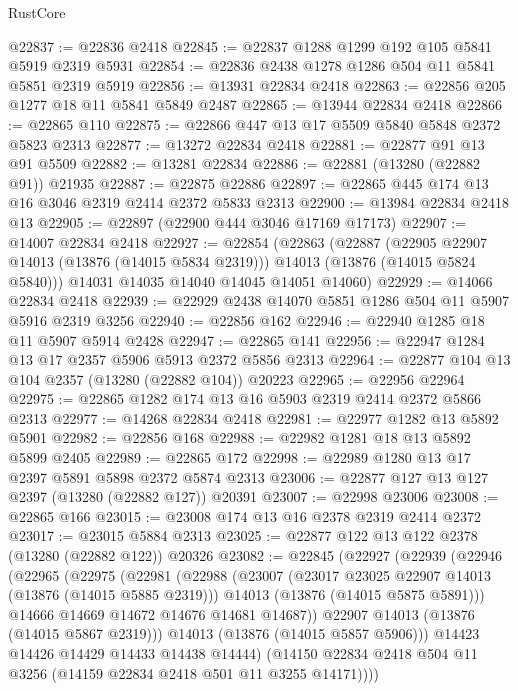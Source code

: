 \begin{lexlean}{RustCore}
\begin{coremodule}
@22837 := @22836 @2418
@22845 := @22837 @1288 @1299 @192 @105 @5841 @5919 @2319 @5931
@22854 := @22836 @2438 @1278 @1286 @504 @11 @5841 @5851 @2319 @5919
@22856 := @13931 @22834 @2418
@22863 := @22856 @205 @1277 @18 @11 @5841 @5849 @2487
@22865 := @13944 @22834 @2418
@22866 := @22865 @110
@22875 := @22866 @447 @13 @17 @5509 @5840 @5848 @2372 @5823 @2313
@22877 := @13272 @22834 @2418
@22881 := @22877 @91 @13 @91 @5509
@22882 := @13281 @22834
@22886 := @22881 (@13280 (@22882 @91)) @21935
@22887 := @22875 @22886
@22897 := @22865 @445 @174 @13 @16 @3046 @2319 @2414 @2372 @5833 @2313
@22900 := @13984 @22834 @2418 @13
@22905 := @22897 (@22900 @444 @3046 @17169 @17173)
@22907 := @14007 @22834 @2418
@22927 := @22854
    (@22863
      (@22887
        (@22905 @22907 @14013 (@13876 (@14015 @5834 @2319)))
        @14013
        (@13876 (@14015 @5824 @5840)))
      @14031
      @14035
      @14040
      @14045
      @14051
      @14060)
@22929 := @14066 @22834 @2418
@22939 := @22929 @2438 @14070 @5851 @1286 @504 @11 @5907 @5916 @2319 @3256
@22940 := @22856 @162
@22946 := @22940 @1285 @18 @11 @5907 @5914 @2428
@22947 := @22865 @141
@22956 := @22947 @1284 @13 @17 @2357 @5906 @5913 @2372 @5856 @2313
@22964 := @22877 @104 @13 @104 @2357 (@13280 (@22882 @104)) @20223
@22965 := @22956 @22964
@22975 := @22865 @1282 @174 @13 @16 @5903 @2319 @2414 @2372 @5866 @2313
@22977 := @14268 @22834 @2418
@22981 := @22977 @1282 @13 @5892 @5901
@22982 := @22856 @168
@22988 := @22982 @1281 @18 @13 @5892 @5899 @2405
@22989 := @22865 @172
@22998 := @22989 @1280 @13 @17 @2397 @5891 @5898 @2372 @5874 @2313
@23006 := @22877 @127 @13 @127 @2397 (@13280 (@22882 @127)) @20391
@23007 := @22998 @23006
@23008 := @22865 @166
@23015 := @23008 @174 @13 @16 @2378 @2319 @2414 @2372
@23017 := @23015 @5884 @2313
@23025 := @22877 @122 @13 @122 @2378 (@13280 (@22882 @122)) @20326
@23082 := @22845
    (@22927
      (@22939
        (@22946
          (@22965
            (@22975
              (@22981
                (@22988
                  (@23007
                    (@23017 @23025 @22907 @14013 (@13876 (@14015 @5885 @2319)))
                    @14013
                    (@13876 (@14015 @5875 @5891)))
                  @14666
                  @14669
                  @14672
                  @14676
                  @14681
                  @14687))
              @22907
              @14013
              (@13876 (@14015 @5867 @2319)))
            @14013
            (@13876 (@14015 @5857 @5906)))
          @14423
          @14426
          @14429
          @14433
          @14438
          @14444)
        (@14150 @22834 @2418 @504 @11 @3256 (@14159 @22834 @2418 @501 @11 @3255 @14171))))

\end{coremodule}
\end{lexlean}
